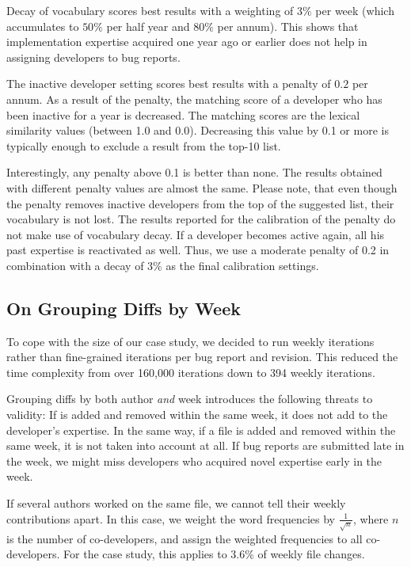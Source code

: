 Decay of vocabulary scores best results with a weighting of $3\%$ per week (which accumulates to $50\%$ per half year and $80\%$ per annum). This shows that implementation expertise acquired one year ago or earlier does not help in assigning developers to bug reports.

The inactive developer setting scores best results with a penalty of $0.2$ per annum. As a result of the penalty, the matching score of a developer who has been inactive for a year is decreased. The matching scores are the lexical similarity values (between 1.0 and 0.0). Decreasing this value by 0.1 or more is typically enough to exclude a result from the top-10 list. 

Interestingly, any penalty above 0.1 is better than none. The results obtained with different penalty values are almost the same. Please note, that even though the penalty removes inactive developers from the top of the suggested list, their vocabulary is not lost. The results reported for the calibration of the penalty do not make use of vocabulary decay. If a developer becomes active again, all his past expertise is reactivated as well. Thus, we use a moderate penalty of 0.2 in combination with a decay of 3\% as the final calibration settings.

\subsection{On Grouping Diffs by Week}

To cope with the size of our case study, we decided to run weekly iterations rather than fine-grained iterations per bug report and revision. This reduced the time complexity from over 160,000 iterations down to 394 weekly iterations.

Grouping diffs by both author \emph{and} week introduces the following threats to validity: 
If \VOC is added and removed within the same week, it does not add to the developer's expertise. 
In the same way, if a file is added and removed within the same week, it is not taken into account at all. 
If bug reports are submitted late in the week, we might miss developers who acquired novel expertise early in the week. 

If several authors worked on the same file, we cannot tell their weekly contributions apart. In this case, we weight the word frequencies by $\frac{1}{\sqrt{n}}$, where $n$ is the number of co-developers, and assign the weighted frequencies to all co-developers. For the \EC case study, this applies to 3.6\% of weekly file changes.

